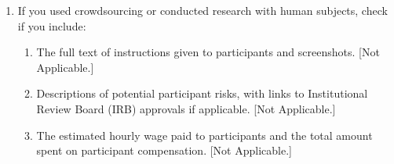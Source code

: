 \begin{enumerate}
  \item If you used crowdsourcing or conducted research with human subjects,
  check if you include:
  \begin{enumerate}
    \item The full text of instructions given to participants and screenshots.
    [Not Applicable.]
    \item Descriptions of potential participant risks, with links to
    Institutional Review Board (IRB) approvals if applicable. [Not Applicable.]
    \item The estimated hourly wage paid to participants and the total amount
    spent on participant compensation. [Not Applicable.]
  \end{enumerate}
\end{enumerate}
